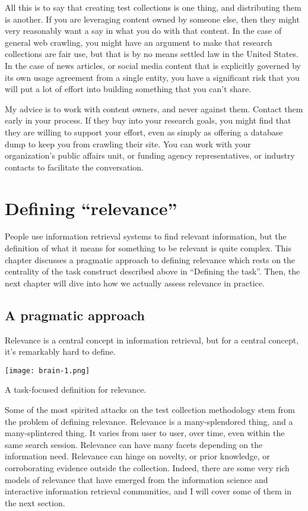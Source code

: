 \documentclass[nobib]{tufte-book}
\begin{document}
All this is to say that creating test collections is one thing, and distributing them is another.  If you are leveraging content owned by someone else, then they might very reasonably want a say in what you do with that content.  In the case of general web crawling, you might have an argument to make that research collections are fair use, but that is by no means settled law in the United States.  In the case of news articles, or social media content that is explicitly governed by its own usage agreement from a single entity, you have a significant risk that you will put a lot of effort into building something that you can't share.

My advice is to work with content owners, and never against them.  Contact them early in your process.  If they buy into your research goals, you might find that they are willing to support your effort, even as simply as offering a database dump to keep you from crawling their site.  You can work with your organization's public affairs unit, or funding agency representatives, or industry contacts to facilitate the conversation.

\chapter{Defining ``relevance''}

People use information retrieval systems to find relevant information, but the definition of what it means for something to be relevant is quite complex.  This chapter discusses a pragmatic approach to defining relevance which rests on the centrality of the task construct described above in ``Defining the task''.  Then, the next chapter will dive into how we actually assess relevance in practice.

\section{A pragmatic approach}

Relevance is a central concept in information retrieval, but for a central concept, it's remarkably hard to define. 
\begin{marginfigure}
    \texttt{[image: brain-1.png]}
    \caption{A task-focused definition for relevance.}
\end{marginfigure}
Some of the most spirited attacks on the test collection methodology stem from the problem of defining relevance.  Relevance is a many-splendored thing, and a many-splintered thing.  It varies from user to user, over time, even within the same search session.  Relevance can have many facets depending on the information need.  Relevance can hinge on novelty, or prior knowledge, or corroborating evidence outside the collection.  Indeed, there are some very rich models of relevance that have emerged from the information science and interactive information retrieval communities, and I will cover some of them in the next section.
\end{document}
